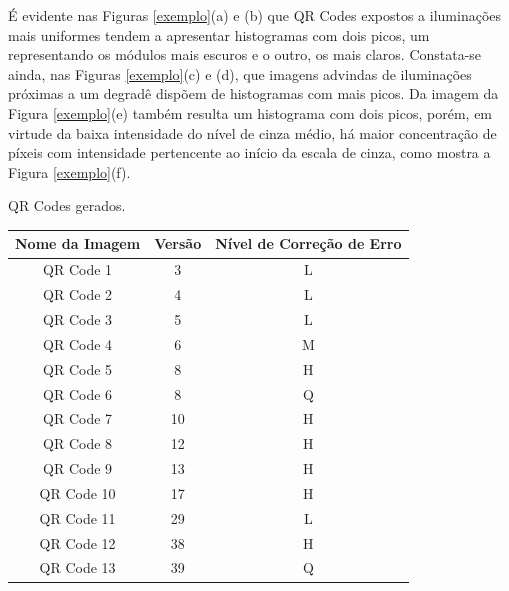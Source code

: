 \documentclass{ceel}
\begin{document}
\begin{multicols}{2}
É evidente nas Figuras \ref{exemplo}(a) e (b) que QR Codes expostos a iluminações mais uniformes tendem a apresentar histogramas com dois picos, um representando os módulos mais escuros e o outro, os mais claros. Constata-se ainda, nas Figuras \ref{exemplo}(c) e (d), que imagens advindas de iluminações próximas a um degradê dispõem de histogramas com mais picos. Da imagem da Figura \ref{exemplo}(e) também resulta um histograma com dois picos, porém, em virtude da baixa intensidade do nível de cinza médio, há maior concentração de píxeis com intensidade pertencente ao início da escala de cinza, como mostra a Figura \ref{exemplo}(f).

\vspace{0.15cm}
\begin{minipage}[h]{\columnwidth}
\begin{scriptsize}
    \def\arraystretch{1.35}
    \captionsetup{type=table}
    \begin{center}
    \caption{QR Codes gerados.} \label{qrtable}
    \vspace{-0.2cm}
    \begin{tabular}{ c  c   c} \toprule
    \textbf{Nome da Imagem}&  \textbf{Versão}&  \textbf{Nível de Correção de Erro}\\\midrule
    QR Code 1  & 3 & L \\
    QR Code 2  & 4 & L \\
    QR Code 3  & 5 & L \\
    QR Code 4  & 6 & M \\
    QR Code 5  & 8 & H  \\
    QR Code 6  & 8 & Q  \\
    QR Code 7  & 10 & H  \\
    QR Code 8  & 12 & H  \\
    QR Code 9  & 13 & H  \\
    QR Code 10 & 17 & H  \\
    QR Code 11 & 29 & L  \\
    QR Code 12 & 38 & H \\
    QR Code 13 & 39 & Q \\\bottomrule
    \end{tabular}
    \end{center}
\end{scriptsize}
\end{minipage}


\end{multicols}
\end{document}
